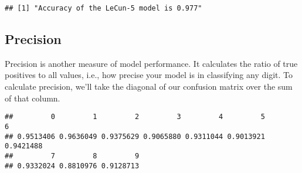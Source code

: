 \documentclass[]{book}
\newenvironment{Shaded}{\begin{snugshade}}{\end{snugshade}}
\newcommand{\KeywordTok}[1]{\textcolor[rgb]{0.13,0.29,0.53}{\textbf{#1}}}
\newcommand{\DecValTok}[1]{\textcolor[rgb]{0.00,0.00,0.81}{#1}}
\newcommand{\StringTok}[1]{\textcolor[rgb]{0.31,0.60,0.02}{#1}}
\newcommand{\ControlFlowTok}[1]{\textcolor[rgb]{0.13,0.29,0.53}{\textbf{#1}}}
\newcommand{\OperatorTok}[1]{\textcolor[rgb]{0.81,0.36,0.00}{\textbf{#1}}}
\newcommand{\NormalTok}[1]{#1}
\theoremstyle{definition}
\theoremstyle{definition}
\theoremstyle{definition}
\theoremstyle{remark}
\begin{document}
\begin{Shaded}
\end{Shaded}

\begin{verbatim}
## [1] "Accuracy of the LeCun-5 model is 0.977"
\end{verbatim}

\subsection{Precision}\label{precision}

Precision is another measure of model performance. It calculates the
ratio of true positives to all values, i.e., how precise your model is
in classifying any digit. To calculate precision, we'll take the
diagonal of our confusion matrix over the sum of that column.

\begin{Shaded}
\end{Shaded}

\begin{verbatim}
##         0         1         2         3         4         5         6 
## 0.9513406 0.9636049 0.9375629 0.9065880 0.9311044 0.9013921 0.9421488 
##         7         8         9 
## 0.9332024 0.8810976 0.9128713
\end{verbatim}
\end{document}
